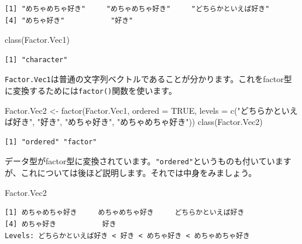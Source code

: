\documentclass[
  a4paper,
  pandoc,
  ja=standard,
  jafont=haranoaji]{bxjsbook}
\newenvironment{Shaded}{\begin{snugshade}}{\end{snugshade}}
\newcommand{\AttributeTok}[1]{\textcolor[rgb]{0.00,0.48,0.65}{#1}}
\newcommand{\ConstantTok}[1]{\textcolor[rgb]{0.56,0.35,0.01}{#1}}
\newcommand{\FunctionTok}[1]{\textcolor[rgb]{0.28,0.35,0.67}{#1}}
\newcommand{\NormalTok}[1]{\textcolor[rgb]{0.00,0.48,0.65}{#1}}
\newcommand{\OtherTok}[1]{\textcolor[rgb]{0.00,0.48,0.65}{#1}}
\newcommand{\StringTok}[1]{\textcolor[rgb]{0.13,0.47,0.30}{#1}}
\begin{document}
\begin{verbatim}
[1] "めちゃめちゃ好き"     "めちゃめちゃ好き"     "どちらかといえば好き"
[4] "めちゃ好き"           "好き"                
\end{verbatim}

\begin{Shaded}
\begin{Highlighting}[numbers=left,,]
\FunctionTok{class}\NormalTok{(Factor.Vec1)}
\end{Highlighting}
\end{Shaded}

\begin{verbatim}
[1] "character"
\end{verbatim}

\texttt{Factor.Vec1}は普通の文字列ベクトルであることが分かります。これをfactor型に変換するためには\texttt{factor()}関数を使います。

\begin{Shaded}
\begin{Highlighting}[numbers=left,,]
\NormalTok{Factor.Vec2 }\OtherTok{\textless{}{-}} \FunctionTok{factor}\NormalTok{(Factor.Vec1, }\AttributeTok{ordered =} \ConstantTok{TRUE}\NormalTok{,}
                      \AttributeTok{levels =} \FunctionTok{c}\NormalTok{(}\StringTok{"どちらかといえば好き"}\NormalTok{, }\StringTok{"好き"}\NormalTok{,}
                                 \StringTok{"めちゃ好き"}\NormalTok{, }\StringTok{"めちゃめちゃ好き"}\NormalTok{))}
\FunctionTok{class}\NormalTok{(Factor.Vec2)}
\end{Highlighting}
\end{Shaded}

\begin{verbatim}
[1] "ordered" "factor" 
\end{verbatim}

データ型がfactor型に変換されています。\texttt{"ordered"}というものも付いていますが、これについては後ほど説明します。それでは中身をみましょう。

\begin{Shaded}
\begin{Highlighting}[numbers=left,,]
\NormalTok{Factor.Vec2}
\end{Highlighting}
\end{Shaded}

\begin{verbatim}
[1] めちゃめちゃ好き     めちゃめちゃ好き     どちらかといえば好き
[4] めちゃ好き           好き                
Levels: どちらかといえば好き < 好き < めちゃ好き < めちゃめちゃ好き
\end{verbatim}
\end{document}
